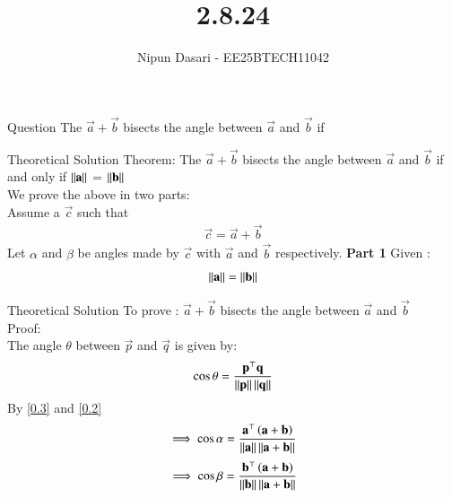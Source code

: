 \documentclass{beamer}
\title %
{2.8.24}
\author %
{Nipun Dasari - EE25BTECH11042}
\begin{document}
	
	\frame{\titlepage}
	\begin{frame}{Question}
		The $\vec{a} + \vec{b}$ bisects the angle between $\vec{a}$ and $\vec{b}$ if \underline{\hspace{2cm}}
	\end{frame}
	
	
	\begin{frame}{Theoretical Solution}
			Theorem: The $\vec{a} + \vec{b}$ bisects the angle between $\vec{a}$ and $\vec{b}$ if and only if $\left\lVert\mathbf{a}\right\rVert$ = $\left\lVert\mathbf{b}\right\rVert$ \\
		We prove the above in two parts:\\
		Assume a $\vec{c}$ such that
		\begin{align}
			\vec{c} = \vec{a} + \vec{b} \label{0.2}
		\end{align}
		Let $\alpha$ and $\beta$ be angles made by $\vec{c}$ with $\vec{a}$ and $\vec{b}$ respectively.
		\textbf{Part 1}
		Given : 
		\begin{align}
			\left\lVert\mathbf{a}\right\rVert = \left\lVert\mathbf{b}\right\rVert \label{0.1}
		\end{align}
	\end{frame}
	\begin{frame}{Theoretical Solution}
		To prove : $\vec{a} + \vec{b}$ bisects the angle between $\vec{a}$ and $\vec{b}$\\
		Proof: \\	
		The angle $\theta$ between $\vec{p}$ and $\vec{q}$ is given by: 
		\begin{align}
			\cos\theta = \frac{\mathbf{p}^\top\mathbf{q}}{\left\lVert\mathbf{p}\right\rVert\left\lVert\mathbf{q}\right\rVert} \label{0.3}
		\end{align}
		By \eqref{0.3} and \eqref{0.2}
		\begin{align}
			\implies \cos\alpha = \frac{\mathbf{a}^\top\left(\mathbf{a}+\mathbf{b}\right)}{\left\lVert\mathbf{a}\right\rVert\left\lVert\mathbf{a}+\mathbf{b}\right\rVert} 
		\end{align}
		\begin{align}
			\implies \cos\beta = \frac{\mathbf{b}^\top\left(\mathbf{a}+\mathbf{b}\right)}{\left\lVert\mathbf{b}\right\rVert\left\lVert\mathbf{a}+\mathbf{b}\right\rVert} 
		\end{align}
	\end{frame}
	
\end{document}
